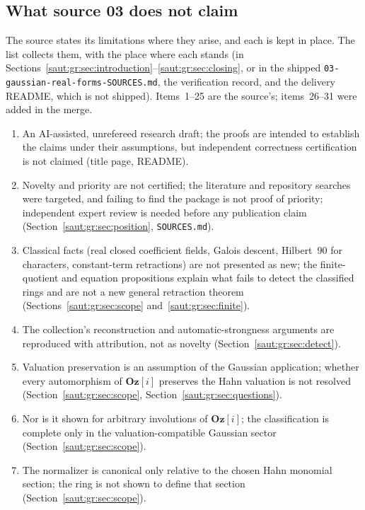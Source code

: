\documentclass[11pt]{article}
\theoremstyle{definition}
\theoremstyle{remark}
\newcommand{\Oz}{\mathbf{Oz}}
\numberwithin{equation}{section}
\begin{document}
\subsection{What source 03 does not claim}\label{saut:gr:sec:nonclaims}

The source states its limitations where they arise, and each is kept in place. The list
collects them, with the place where each stands (in
Sections~\ref{saut:gr:sec:introduction}--\ref{saut:gr:sec:closing}, or in the shipped
\texttt{03-gaussian-real-forms-SOURCES.md}, the verification record, and the delivery
README, which is not shipped). Items~1--25 are the source's; items~26--31 were added in
the merge.
\begin{enumerate}[label=\arabic*.,leftmargin=2.2em]
\item An AI-assisted, unrefereed research draft; the proofs are intended to establish the
claims under their assumptions, but independent correctness certification is not claimed
(title page, README).
\item Novelty and priority are not certified; the literature and repository searches were
targeted, and failing to find the package is not proof of priority; independent expert
review is needed before any publication claim
(Section~\ref{saut:gr:sec:position}, \texttt{SOURCES.md}).
\item Classical facts (real closed coefficient fields, Galois descent, Hilbert~90 for
characters, constant-term retractions) are not presented as new; the finite-quotient and
equation propositions explain what fails to detect the classified rings and are not a new
general retraction theorem (Sections~\ref{saut:gr:sec:scope} and~\ref{saut:gr:sec:finite}).
\item The collection's reconstruction and automatic-strongness arguments are reproduced with
attribution, not as novelty (Section~\ref{saut:gr:sec:detect}).
\item Valuation preservation is an assumption of the Gaussian application; whether every
automorphism of $\Oz[i]$ preserves the Hahn valuation is not resolved
(Section~\ref{saut:gr:sec:scope}, Section~\ref{saut:gr:sec:questions}).
\item Nor is it shown for arbitrary involutions of $\Oz[i]$; the classification is complete
only in the valuation-compatible Gaussian sector (Section~\ref{saut:gr:sec:scope}).
\item The normalizer is canonical only relative to the chosen Hahn monomial section; the ring
is not shown to define that section (Section~\ref{saut:gr:sec:scope}).

\end{enumerate}
\end{document}
